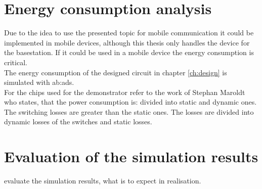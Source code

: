 \section{Energy consumption analysis}
Due to the idea to use the presented topic for mobile communication it could be implemented in mobile devices, although this thesis only handles the device for the basestation. If it could be used in a mobile device the energy consumption is critical.\\
The energy consumption of the designed circuit in chapter \ref{ch:design} is simulated with \gls{ab:ads}.\\
 For the chips used for the demonstrator refer to the work of Stephan Maroldt who states, that the power consumption is:  divided into static and dynamic ones. The switching losses are greater than the static ones.
The losses are divided into dynamic losses of the switches and static losses.

\section{Evaluation of the simulation results}
evaluate the simulation results, what is to expect in realisation.
